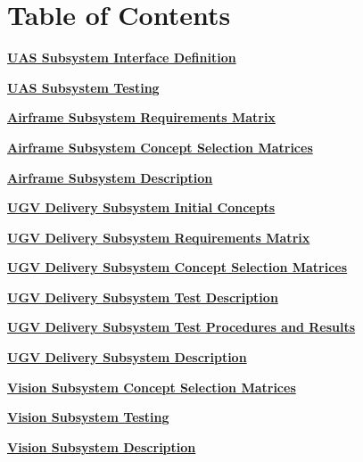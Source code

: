 \documentclass[]{article}
\newcounter{includepdfpage}
\newcommand{\pdflink}[2]{
\hyperlink{#1.1}{\textbf{#2}}
}
\newcommand{\pdflinkdoc}[2]{

}
\begin{document}



\section*{Table of Contents}

\pdflink{ss_def}{UAS Subsystem Interface Definition}

\pdflink{ss_test}{UAS Subsystem Testing}


\pdflink{af_reqmat}{Airframe Subsystem Requirements Matrix}

\pdflink{af_select}{Airframe Subsystem Concept Selection Matrices}

\pdflink{af_def}{Airframe Subsystem Description}


\pdflink{ugv_init}{UGV Delivery Subsystem Initial Concepts}

\pdflink{ugv_reqmat}{UGV Delivery Subsystem Requirements Matrix}

\pdflink{ugv_select}{UGV Delivery Subsystem Concept Selection Matrices}

\pdflink{ugv_test}{UGV Delivery Subsystem Test Description}

\pdflink{ugv_proc}{UGV Delivery Subsystem Test Procedures and Results}

\pdflink{ugv_def}{UGV Delivery Subsystem Description}


\pdflink{vis_select}{Vision Subsystem Concept Selection Matrices}

\pdflink{vis_test}{Vision Subsystem Testing}

\pdflink{vis_def}{Vision Subsystem Description}


\pdflinkdoc{ss_def}{./SubsystemInterfaces/SubsystemInterfacesDescription/SubsystemInterfaceDefinitions.pdf}
\pdflinkdoc{ss_test}{./SubsystemInterfaces/SITestProceduresAndResults/SITestProceduresAndResults.pdf}

\pdflinkdoc{af_reqmat}{./Airframe/AirframeRequirementsMatrix/AirframeRequirementsMatrix.pdf}
\pdflinkdoc{af_select}{./Airframe/AirframeConceptSelectionMatrices/AirframeConceptSelectionMatrices.pdf}
\pdflinkdoc{af_def}{./Airframe/AirframeDescription/AirframeDescription.pdf}

\pdflinkdoc{ugv_init}{./UGV/UGVInitialConcepts/InitialConceptGeneration.pdf}
\pdflinkdoc{ugv_reqmat}{./UGV/UGVRequirmentsMatrix/main.pdf}
\pdflinkdoc{ugv_select}{./UGV/UGVConceptSelectionMatrices/UGVConceptSelectionMatrices.pdf}
\pdflinkdoc{ugv_test}{./UGV/UGVTestDescription/UGV_TestDescription.pdf}
\pdflinkdoc{ugv_proc}{./UGV/UGVConceptTestProceduresAndResults/UGVConceptTestProceduresAndResults.pdf}
\pdflinkdoc{ugv_def}{./UGV/UGVDescription/UGVConceptDescription.pdf}

\pdflinkdoc{vis_select}{./VisionConceptDescription/VisionConceptSelectionMatrices/VisionConceptSelectionMatrices.pdf}
\pdflinkdoc{vis_test}{./VisionConceptDescription/VisionConceptTestProceduresAndResults/VisionTestProceduresAndResults.pdf}
\pdflinkdoc{vis_def}{./VisionConceptDescription/VisionDescription/VisionConceptDescription.pdf}
\end{document}
